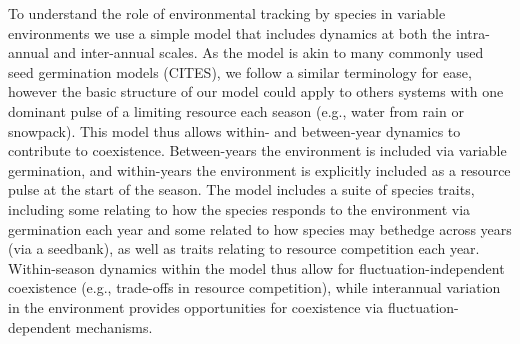 \documentclass[11pt,letterpaper]{article}
\begin{document}
To understand the role of environmental tracking by species in variable environments we use a simple model that includes dynamics at both the intra-annual and inter-annual scales. As the model is akin to many commonly used seed germination models (CITES), we follow a similar terminology for ease, however the basic structure of our model could apply to others systems with one dominant pulse of a limiting resource each season (e.g., water from rain or snowpack).  This model thus allows within- and between-year dynamics to contribute to coexistence. Between-years the environment is included via variable germination, and within-years the environment is explicitly included as a resource pulse at the start of the season. The model includes a suite of species traits, including some relating to how the species responds to the environment via germination each year and some related to how species may bethedge across years (via a seedbank), as well as traits relating to resource competition each year. Within-season dynamics within the model thus allow for fluctuation-independent coexistence (e.g., trade-offs in resource competition), while interannual variation in the environment provides opportunities for coexistence via fluctuation-dependent mechanisms. \\

\end{document}

